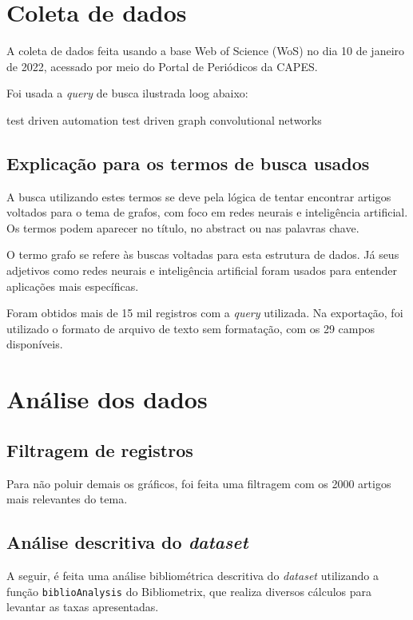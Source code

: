 \section{Coleta de dados\label{MASSA:coleta}}

A coleta de dados feita usando a base Web of Science (WoS) no dia 10 de janeiro de 2022, acessado por meio do Portal de Periódicos da CAPES.

Foi usada a \textit{query} de busca ilustrada loog abaixo:

test driven automation
test driven
graph convolutional networks

\subsection{Explicação para os termos de busca usados\label{sec:titofrota:query}}

A busca utilizando estes termos se deve pela lógica de tentar encontrar artigos voltados para o tema de grafos, com foco em redes neurais e inteligência artificial. Os termos podem aparecer no título, no abstract ou nas palavras chave.

O termo grafo se refere às buscas voltadas para esta estrutura de dados. Já seus adjetivos como redes neurais e inteligência artificial foram usados para entender aplicações mais específicas.

Foram obtidos mais de 15 mil registros com a \textit{query} utilizada. Na exportação, foi utilizado o formato de arquivo de texto sem formatação, com os 29 campos disponíveis.

\section{Análise dos dados}

\subsection{Filtragem de registros}

Para não poluir demais os gráficos, foi feita uma filtragem com os 2000 artigos mais relevantes do tema.

\subsection{Análise descritiva do \textit{dataset} }

A seguir, é feita uma análise bibliométrica descritiva do \textit{dataset} utilizando a função \texttt{biblioAnalysis} do Bibliometrix, que realiza diversos cálculos para levantar as taxas apresentadas.

